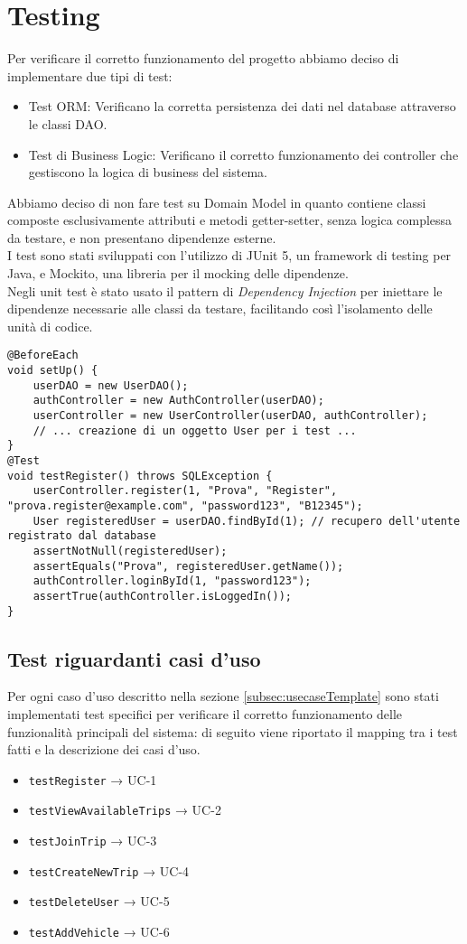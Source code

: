 \section{Testing}

Per verificare il corretto funzionamento del progetto abbiamo deciso di implementare due tipi di test:
\begin{itemize}
    \item Test ORM: Verificano la corretta persistenza dei dati nel database attraverso le classi DAO.
    \item Test di Business Logic: Verificano il corretto funzionamento dei controller che gestiscono la logica di business del sistema.
\end{itemize}
Abbiamo deciso di non fare test su Domain Model in quanto contiene classi composte esclusivamente attributi e metodi getter-setter, senza logica complessa da testare, e non presentano dipendenze esterne.\\
I test sono stati sviluppati con l'utilizzo di JUnit 5, un framework di testing per Java, e Mockito, una libreria per il mocking delle dipendenze.\\
Negli unit test è stato usato il pattern di \textit{Dependency Injection} per iniettare le dipendenze necessarie alle classi da testare, facilitando così l'isolamento delle unità di codice.\\
\begin{lstlisting}[style=java, caption={Esempio di Dependency Injection in UserControllerTest}]
@BeforeEach
void setUp() {
    userDAO = new UserDAO();
    authController = new AuthController(userDAO);
    userController = new UserController(userDAO, authController);
    // ... creazione di un oggetto User per i test ...
}
@Test
void testRegister() throws SQLException {
    userController.register(1, "Prova", "Register", "prova.register@example.com", "password123", "B12345");
    User registeredUser = userDAO.findById(1); // recupero dell'utente registrato dal database
    assertNotNull(registeredUser);
    assertEquals("Prova", registeredUser.getName());
    authController.loginById(1, "password123");
    assertTrue(authController.isLoggedIn());
}
\end{lstlisting}
\subsection{Test riguardanti casi d'uso}
Per ogni caso d'uso descritto nella sezione \ref{subsec:usecaseTemplate} sono stati implementati test specifici per verificare il corretto funzionamento delle funzionalità principali del sistema: di seguito viene riportato il mapping tra i test fatti e la descrizione dei casi d'uso.
\begin{itemize}
    \item \texttt{testRegister} → UC-1
    \item \texttt{testViewAvailableTrips} → UC-2
    \item \texttt{testJoinTrip} → UC-3
    \item \texttt{testCreateNewTrip} → UC-4
    \item \texttt{testDeleteUser} → UC-5
    \item \texttt{testAddVehicle} → UC-6
\end{itemize}
